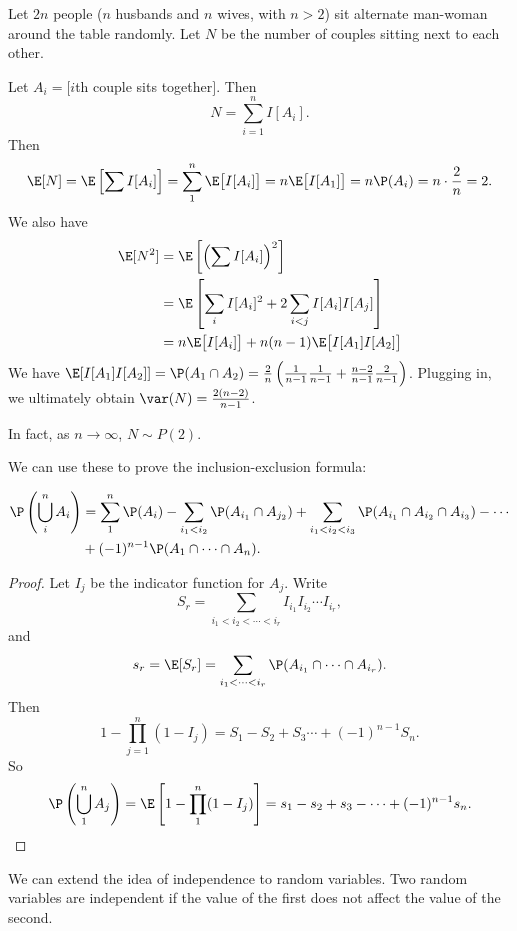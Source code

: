 \documentclass[a4paper]{article}
\begin{document}
\begin{eg}
  Let $2n$ people ($n$ husbands and $n$ wives, with $n > 2$) sit alternate man-woman around the table randomly. Let $N$ be the number of couples sitting next to each other.

  Let $A_i = [i$th couple sits together$]$. Then
  \[
    N = \sum_{i = 1}^n I[A_i].
  \]
  Then
  \[
    \E[N] = \E\left[\sum I[A_i]\right] = \sum_{1}^n \E\big[I[A_i]\big] = n\E\big[I[A_1]\big] = n\P(A_i) = n\cdot \frac{2}{n} = 2.
  \]
  We also have
  \begin{align*}
    \E[N^2] &= \E\left[\left(\sum I[A_i]\right)^2\right]\\
    &= \E\left[\sum_i I[A_i]^2 + 2\sum_{i < j}I[A_i]I[A_j]\right]\\
    &= n\E\big[I[A_i]\big] + n(n - 1)\E\big[I[A_1]I[A_2]\big]
  \end{align*}
  We have $\E[I[A_1]I[A_2]] = \P(A_1\cap A_2) = \frac{2}{n}\left(\frac{1}{n - 1}\frac{1}{n - 1} + \frac{n - 2}{n - 1}\frac{2}{n - 1}\right)$. Plugging in, we ultimately obtain $\var(N) = \frac{2(n- 2)}{n - 1}$.

  In fact, as $n\to \infty$, $N\sim P(2)$.
\end{eg}

We can use these to prove the inclusion-exclusion formula:
\begin{thm}
  \begin{align*}
    \P\left(\bigcup_i^n A_i\right) &= \sum_1^n \P(A_i) - \sum_{i_1 < i_2} \P(A_{i_1}\cap A_{j_2}) + \sum_{i_1 < i_2 < i_3}\P(A_{i_1}\cap A_{i_2} \cap A_{i_3}) - \cdots\\
    &+ (-1)^{n - 1} \P(A_1\cap \cdots \cap A_n).
  \end{align*}
\end{thm}

\begin{proof}
  Let $I_j$ be the indicator function for $A_j$. Write
  \[
    S_r = \sum_{i_1 < i_2 < \cdots < i_r}I_{i_1}I_{i_2}\cdots I_{i_r},
  \]
  and
  \[
    s_r = \E[S_r] = \sum_{i_1 < \cdots < i_r}\P(A_{i_1}\cap \cdots \cap A_{i_r}).
  \]
  Then
  \[
    1 - \prod_{j = 1}^n(1 - I_j) = S_1 - S_2 + S_3 \cdots + (-1)^{n - 1}S_n.
  \]
  So
  \[
    \P\left(\bigcup_1^n A_j\right) = \E\left[1 - \prod_1^n(1 - I_j)\right] = s_1 - s_2 + s_3 - \cdots + (-1)^{n - 1}s_n.
  \]
\end{proof}

We can extend the idea of independence to random variables. Two random variables are independent if the value of the first does not affect the value of the second.
\end{document}
